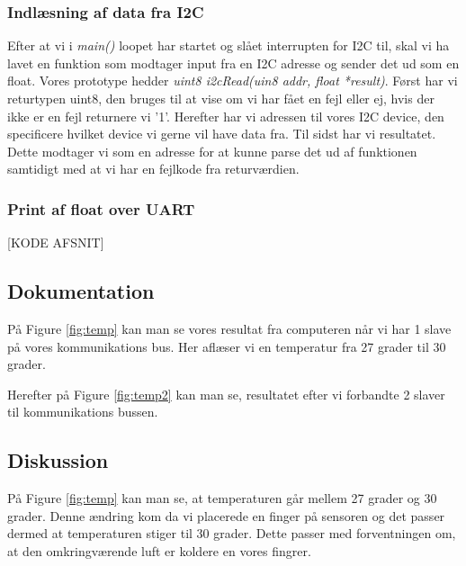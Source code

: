 \documentclass[../main.tex]{subfiles}
\begin{document}
\subsubsection{Indlæsning af data fra I2C}
Efter at vi i \textit{main()} loopet har startet og slået interrupten for I2C til, skal vi ha lavet en funktion som modtager input fra en I2C adresse og sender det ud som en float.
Vores prototype hedder \textit{uint8 i2cRead(uin8 addr, float *result)}. Først har vi returtypen uint8, den bruges til at vise om vi har fået en fejl eller ej, hvis der ikke er en fejl returnere vi '1'.
Herefter har vi adressen til vores I2C device, den specificere hvilket device vi gerne vil have data fra.
Til sidst har vi resultatet. Dette modtager vi som en adresse for at kunne parse det ud af funktionen samtidigt med at vi har en fejlkode fra returværdien.




\subsubsection{Print af float over UART}

[KODE AFSNIT]

\subsection{Dokumentation}

På Figure \ref{fig:temp} kan man se vores resultat fra computeren når vi har 1 slave på vores kommunikations bus. Her aflæser vi en temperatur fra 27 grader til 30 grader.

Herefter på Figure \ref{fig:temp2} kan man se, resultatet efter vi forbandte 2 slaver til kommunikations bussen.



\subsection{Diskussion}
På Figure \ref{fig:temp} kan man se, at temperaturen går mellem 27 grader og 30 grader. Denne ændring kom da vi placerede en finger på sensoren og det passer dermed at temperaturen stiger til 30 grader.
Dette passer med forventningen om, at den omkringværende luft er koldere en vores fingrer.
\end{document}
